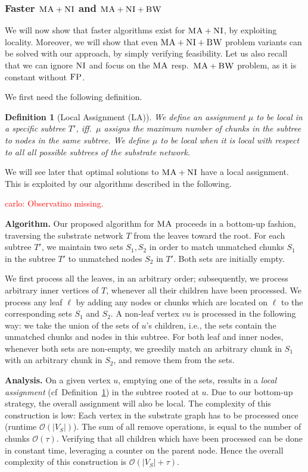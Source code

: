 \documentclass[9pt]{sigcomm-alternate}
\newcommand{\carlo}[1]{\textcolor{red}{carlo: #1}}
\newcommand{\VmChunkAssignment}{\mu}
\newcommand{\ChunkType}{\tau}
\newcommand{\SubstrateNodes}{\ensuremath{V_S}}
\newcommand{\CC}{\textsc{NI}}
\newcommand{\FP}{\textsc{FP}}
\newcommand{\BW}{\textsc{BW}}
\newcommand{\MA}{\textsc{MA}}
\newtheorem{defn}{Definition}
\newcommand{\Tree}{\ensuremath{T}}
\begin{document}
\subsubsection{Faster $\MA+\CC$ and $\MA+\CC+\BW$}

We will now show that faster algorithms exist for $\MA+\CC$, by exploiting
locality. Moreover, we will show that
even
$\MA+\CC+\BW$ problem variants can be solved with our approach, by simply
verifying feasibility.
Let us also recall that we can ignore $\CC$ and focus on the $\MA$ resp.~$\MA+\BW$ problem,
as it is constant
without $\FP$.

We first need the following definition.
\begin{defn}[Local Assignment (LA)]\label{def:loc}
We define an assignment $\VmChunkAssignment$ to
be \emph{local in a specific subtree $\Tree'$}, iff.~$\VmChunkAssignment$
assigns the maximum number of chunks in the
subtree to nodes in the same subtree.
We define $\VmChunkAssignment$ to be \emph{local} when
it is local with respect to all all possible subtrees of the substrate network.
\end{defn}

We will see later that
optimal solutions to
$\MA+\CC$ have a local assignment. This is exploited by our algorithms described
in the following.

\carlo{Observatino missing.}

\textbf{Algorithm.} Our proposed algorithm for $\MA$
proceeds in a bottom-up fashion, traversing the substrate network $\Tree$
from the leaves toward the root.
For each subtree $\Tree'$, we maintain
two sets $S_1,S_2$ in order to match unmatched
chunks $S_1$ in the subtree $\Tree'$ to unmatched
nodes $S_2$ in $\Tree'$. Both sets are initially empty.

We first process all the leaves, in an arbitrary order; subsequently, we process arbitrary inner vertices
of $\Tree$, whenever all their children have been processed.
We process any leaf $\ell$
by adding any
nodes or chunks which are located on $\ell$ to the corresponding sets $S_1$ and $S_2$.
A non-leaf vertex $vu$ is processed in the following way: we take the union of
the sets of $u$'s children, i.e., the sets contain the unmatched chunks and nodes
in this subtree.
For both leaf and inner nodes, whenever
both sets are non-empty, we greedily match an arbitrary chunk in $S_1$ with an arbitrary chunk in $S_2$,
and remove them from the sets.

\textbf{Analysis.} On a given vertex $u$, emptying one of the sets, results in a \emph{local assignment} (cf~Definition~\ref{def:loc})
in the
subtree rooted at $u$. Due to our bottom-up strategy, the overall assignment
will also be local.
The complexity of this
construction is low: Each
vertex in the substrate graph has to be processed once (runtime
$\mathcal{O}(|\SubstrateNodes|)$). The sum of all remove operations, is equal to
the number of chunks $\mathcal{O}(\ChunkType)$. Verifying that all children
which have
been processed can be done in constant time, leveraging a counter on the parent
node. Hence the overall complexity of this construction is
$\mathcal{O}(|\SubstrateNodes| + \ChunkType)$.
\end{document}
